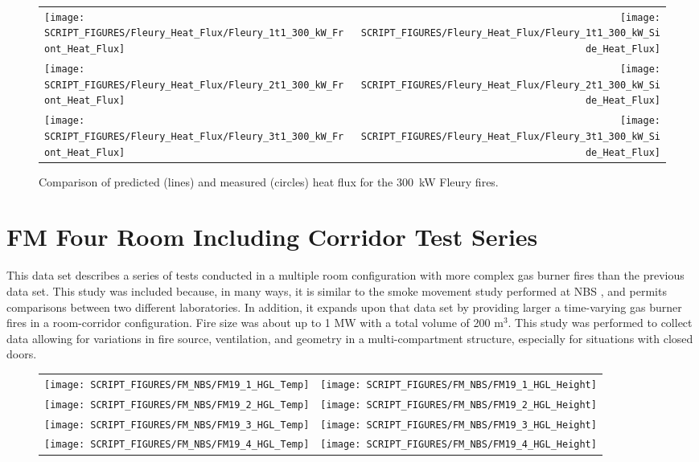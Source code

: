 \begin{figure}[p]
\begin{tabular*}{\textwidth}{l@{\extracolsep{\fill}}r}
\texttt{[image: SCRIPT\_FIGURES/Fleury\_Heat\_Flux/Fleury\_1t1\_300\_kW\_Front\_Heat\_Flux]} &
\texttt{[image: SCRIPT\_FIGURES/Fleury\_Heat\_Flux/Fleury\_1t1\_300\_kW\_Side\_Heat\_Flux]} \\
\texttt{[image: SCRIPT\_FIGURES/Fleury\_Heat\_Flux/Fleury\_2t1\_300\_kW\_Front\_Heat\_Flux]} &
\texttt{[image: SCRIPT\_FIGURES/Fleury\_Heat\_Flux/Fleury\_2t1\_300\_kW\_Side\_Heat\_Flux]} \\
\texttt{[image: SCRIPT\_FIGURES/Fleury\_Heat\_Flux/Fleury\_3t1\_300\_kW\_Front\_Heat\_Flux]} &
\texttt{[image: SCRIPT\_FIGURES/Fleury\_Heat\_Flux/Fleury\_3t1\_300\_kW\_Side\_Heat\_Flux]}
\end{tabular*}
\label{Fleury_Heat_Flux_300_kW}
\caption[Fleury Heat Flux, 300 kW fires.]
{Comparison of predicted (lines) and measured (circles) heat flux for the 300~kW Fleury fires.}
\end{figure}

\clearpage

\section{FM Four Room Including Corridor Test Series}

This data set describes a series of tests conducted in a multiple room configuration with more complex gas burner fires than the previous data set.  This study \cite{Heskestad:1986} was included because, in many ways, it is similar to the smoke movement study performed at NBS \cite{Peacock:1988}, and permits comparisons between two different laboratories. In addition, it expands upon that data set by providing larger a time-varying gas burner fires in a room-corridor configuration. Fire size was about up to 1 MW with a total volume of 200 m$^3$. This study was performed to collect data allowing for variations in fire source, ventilation, and geometry in a multi-compartment structure, especially for situations with closed doors.

\begin{figure}[p]
\begin{tabular*}{\textwidth}{l@{\extracolsep{\fill}}r}
\texttt{[image: SCRIPT\_FIGURES/FM\_NBS/FM19\_1\_HGL\_Temp]} &
\texttt{[image: SCRIPT\_FIGURES/FM\_NBS/FM19\_1\_HGL\_Height]} \\
\texttt{[image: SCRIPT\_FIGURES/FM\_NBS/FM19\_2\_HGL\_Temp]} &
\texttt{[image: SCRIPT\_FIGURES/FM\_NBS/FM19\_2\_HGL\_Height]} \\
\texttt{[image: SCRIPT\_FIGURES/FM\_NBS/FM19\_3\_HGL\_Temp]} &
\texttt{[image: SCRIPT\_FIGURES/FM\_NBS/FM19\_3\_HGL\_Height]} \\
\texttt{[image: SCRIPT\_FIGURES/FM\_NBS/FM19\_4\_HGL\_Temp]} &
\texttt{[image: SCRIPT\_FIGURES/FM\_NBS/FM19\_4\_HGL\_Height]} \\
\end{tabular*}
\end{figure}

